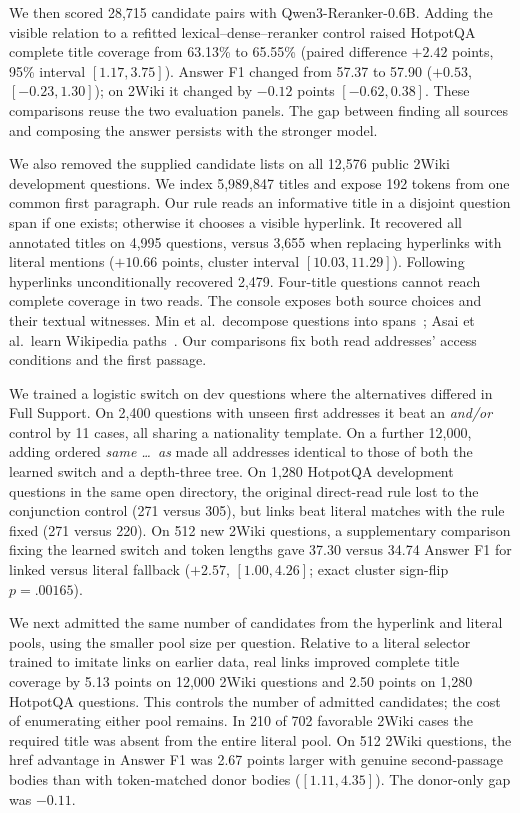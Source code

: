 \documentclass[conference]{IEEEtran}
\begin{document}
We then scored 28,715 candidate pairs with Qwen3-Reranker-0.6B. Adding the visible relation to a refitted lexical--dense--reranker control raised HotpotQA complete title coverage from 63.13\% to 65.55\% (paired difference $+2.42$ points, 95\% interval $[1.17,3.75]$). Answer F1 changed from 57.37 to 57.90 ($+0.53$, $[-0.23,1.30]$); on 2Wiki it changed by $-0.12$ points $[-0.62,0.38]$. These comparisons reuse the two evaluation panels. The gap between finding all sources and composing the answer persists with the stronger model.

We also removed the supplied candidate lists on all 12,576 public 2Wiki development questions. We index 5,989,847 titles and expose 192 tokens from one common first paragraph. Our rule reads an informative title in a disjoint question span if one exists; otherwise it chooses a visible hyperlink. It recovered all annotated titles on 4,995 questions, versus 3,655 when replacing hyperlinks with literal mentions ($+10.66$ points, cluster interval $[10.03,11.29]$). Following hyperlinks unconditionally recovered 2,479. Four-title questions cannot reach complete coverage in two reads. The console exposes both source choices and their textual witnesses. Min et al.\ decompose questions into spans~\cite{decomp}; Asai et al.\ learn Wikipedia paths~\cite{asai}. Our comparisons fix both read addresses' access conditions and the first passage.

We trained a logistic switch on dev questions where the alternatives differed in Full Support. On 2,400 questions with unseen first addresses it beat an \emph{and/or} control by 11 cases, all sharing a nationality template. On a further 12,000, adding ordered \emph{same \ldots\ as} made all addresses identical to those of both the learned switch and a depth-three tree. On 1,280 HotpotQA development questions in the same open directory, the original direct-read rule lost to the conjunction control (271 versus 305), but links beat literal matches with the rule fixed (271 versus 220). On 512 new 2Wiki questions, a supplementary comparison fixing the learned switch and token lengths gave 37.30 versus 34.74 Answer F1 for linked versus literal fallback ($+2.57$, $[1.00,4.26]$; exact cluster sign-flip $p=.00165$).

We next admitted the same number of candidates from the hyperlink and literal pools, using the smaller pool size per question. Relative to a literal selector trained to imitate links on earlier data, real links improved complete title coverage by 5.13 points on 12,000 2Wiki questions and 2.50 points on 1,280 HotpotQA questions. This controls the number of admitted candidates; the cost of enumerating either pool remains. In 210 of 702 favorable 2Wiki cases the required title was absent from the entire literal pool. On 512 2Wiki questions, the href advantage in Answer F1 was 2.67 points larger with genuine second-passage bodies than with token-matched donor bodies ($[1.11,4.35]$). The donor-only gap was $-0.11$.
\end{document}
